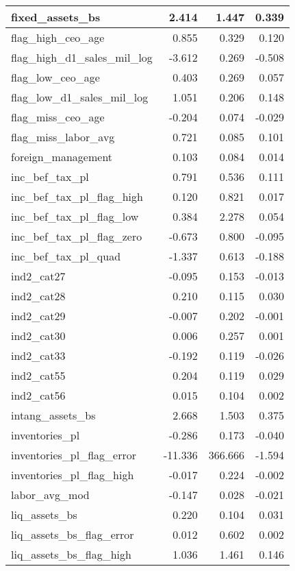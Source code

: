 \begin{table}
\begin{tabular}[t]{l|r|r|r}
\hline
fixed\_assets\_bs & 2.414 & 1.447 & 0.339\\
\hline
flag\_high\_ceo\_age & 0.855 & 0.329 & 0.120\\
\hline
flag\_high\_d1\_sales\_mil\_log & -3.612 & 0.269 & -0.508\\
\hline
flag\_low\_ceo\_age & 0.403 & 0.269 & 0.057\\
\hline
flag\_low\_d1\_sales\_mil\_log & 1.051 & 0.206 & 0.148\\
\hline
flag\_miss\_ceo\_age & -0.204 & 0.074 & -0.029\\
\hline
flag\_miss\_labor\_avg & 0.721 & 0.085 & 0.101\\
\hline
foreign\_management & 0.103 & 0.084 & 0.014\\
\hline
inc\_bef\_tax\_pl & 0.791 & 0.536 & 0.111\\
\hline
inc\_bef\_tax\_pl\_flag\_high & 0.120 & 0.821 & 0.017\\
\hline
inc\_bef\_tax\_pl\_flag\_low & 0.384 & 2.278 & 0.054\\
\hline
inc\_bef\_tax\_pl\_flag\_zero & -0.673 & 0.800 & -0.095\\
\hline
inc\_bef\_tax\_pl\_quad & -1.337 & 0.613 & -0.188\\
\hline
ind2\_cat27 & -0.095 & 0.153 & -0.013\\
\hline
ind2\_cat28 & 0.210 & 0.115 & 0.030\\
\hline
ind2\_cat29 & -0.007 & 0.202 & -0.001\\
\hline
ind2\_cat30 & 0.006 & 0.257 & 0.001\\
\hline
ind2\_cat33 & -0.192 & 0.119 & -0.026\\
\hline
ind2\_cat55 & 0.204 & 0.119 & 0.029\\
\hline
ind2\_cat56 & 0.015 & 0.104 & 0.002\\
\hline
intang\_assets\_bs & 2.668 & 1.503 & 0.375\\
\hline
inventories\_pl & -0.286 & 0.173 & -0.040\\
\hline
inventories\_pl\_flag\_error & -11.336 & 366.666 & -1.594\\
\hline
inventories\_pl\_flag\_high & -0.017 & 0.224 & -0.002\\
\hline
labor\_avg\_mod & -0.147 & 0.028 & -0.021\\
\hline
liq\_assets\_bs & 0.220 & 0.104 & 0.031\\
\hline
liq\_assets\_bs\_flag\_error & 0.012 & 0.602 & 0.002\\
\hline
liq\_assets\_bs\_flag\_high & 1.036 & 1.461 & 0.146\\

\end{tabular}
\end{table}
